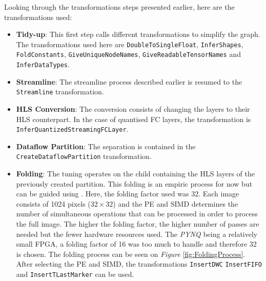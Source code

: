 Looking through the transformations steps presented earlier, here are the transformations used:
\begin{itemize}
  \item \textbf{Tidy-up}: This first step calls different transformations to simplify the graph. The transformations used here are \texttt{DoubleToSingleFloat}, \texttt{InferShapes}, \texttt{FoldConstants}, \texttt{GiveUniqueNodeNames}, \texttt{GiveReadableTensorNames} and \texttt{InferDataTypes}.
  \item \textbf{Streamline}: The streamline process described earlier is resumed to the \texttt{Streamline} transformation.
  \item \textbf{HLS Conversion}: The conversion consists of changing the layers to their HLS counterpart. In the case of quantised FC layers, the transformation is \texttt{InferQuantizedStreamingFCLayer}.
  \item \textbf{Dataflow Partition}: The separation is contained in the \texttt{CreateDataflowPartition} transformation.
  \item \textbf{Folding}: The tuning operates on the child containing the HLS layers of the previously created partition. This folding is an empiric process for now but can be guided using . Here, the folding factor used was 32. Each image consists of 1024 pixels ($32 \times 32$) and the PE and SIMD determines the number of simultaneous operations that can be processed in order to process the full image. The higher the folding factor, the higher number of passes are needed but the fewer hardware resources used. The \emph{PYNQ} being a relatively small FPGA, a folding factor of 16 was too much to handle and therefore 32 is chosen. The folding process can be seen on \emph{Figure} \ref{fig:FoldingProcess}. After selecting the PE and SIMD, the transformations \texttt{InsertDWC} \texttt{InsertFIFO} and \texttt{InsertTLastMarker} can be used.


\end{itemize}
